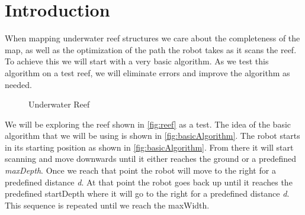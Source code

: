 \documentclass[twoside, 12pt]{article}
\begin{document}
\newpage
{}

\section{Introduction}
\label{sec:introduction}

When mapping underwater reef structures we care about the completeness of the map, as well as the optimization of the path the robot takes as it scans the reef. To achieve this we will start with a very basic algorithm. As we test this algorithm on a test reef, we will eliminate errors and improve the algorithm as needed.\\

\begin{figure}
\vspace{-26pt}
  \begin{center}
  \end{center}
\vspace{-20pt}
  \caption{Underwater Reef}
  \label{fig:reef}
\vspace{-10pt}
\end{figure}

We will be exploring the reef shown in \autoref{fig:reef} as a test. The idea of the basic algorithm that we will be using is shown in \autoref{fig:basicAlgorithm}. The robot starts in its starting position as shown in \autoref{fig:basicAlgorithm}. From there it will start scanning and move downwards until it either reaches the ground or a predefined \textit{maxDepth}. Once we reach that point the robot will move to the right for a predefined distance \textit{d}. At that point the robot goes back up until it reaches the predefined startDepth where it will go to the right for a predefined distance \textit{d}. This sequence is repeated until we reach the maxWidth.\\
\end{document}

